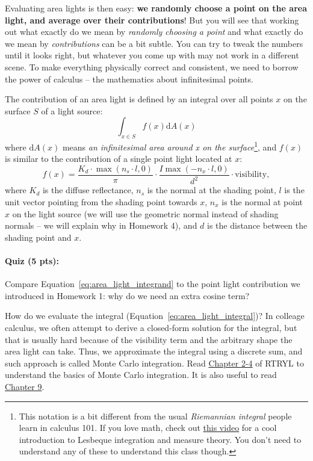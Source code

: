 Evaluating area lights is then easy: \textbf{we randomly choose a point on the area light, and average over their contributions}! But you will see that working out what exactly do we mean by \emph{randomly choosing a point} and what exactly do we mean by \emph{contributions} can be a bit subtle. You can try to tweak the numbers until it looks right, but whatever you come up with may not work in a different scene. To make everything physically correct and consistent, we need to borrow the power of calculus -- the mathematics about infinitesimal points.

The contribution of an area light is defined by an integral over all points $x$ on the surface $S$ of a light source:
\begin{equation}
    \int_{x \in S} f(x) \mathrm{d}A(x)
    \label{eq:area_light_integral}
\end{equation}
where $\mathrm{d}A(x)$ means \emph{an infinitesimal area around x on the surface}\footnote{This notation is a bit different from the usual \emph{Riemannian integral} people learn in calculus 101. If you love math, check out \href{https://www.youtube.com/watch?v=LDNDTOVnKJk}{this video} for a cool introduction to Lesbeque integration and measure theory. You don't need to understand any of these to understand this class though.}, and $f(x)$ is similar to the contribution of a single point light located at $x$:
\begin{equation}
    f(x) = \frac{K_d \cdot \max\left(n_s \cdot l, 0\right)}{\pi} \cdot \frac{I \max\left(-n_x \cdot l, 0\right)}{d^2} \cdot \text{visibility},
    \label{eq:area_light_integrand}
\end{equation}
where $K_d$ is the diffuse reflectance, $n_s$ is the normal at the shading point, $l$ is the unit vector pointing from the shading point towards $x$, $n_x$ is the normal at point $x$ on the light source (we will use the geometric normal instead of shading normals -- we will explain why in Homework 4), and $d$ is the distance between the shading point and $x$.

\paragraph{Quiz (5 pts):} Compare Equation~\eqref{eq:area_light_integrand} to the point light contribution we introduced in Homework 1: why do we need an extra cosine term?

How do we evaluate the integral (Equation~\eqref{eq:area_light_integral})? In colleage calculus, we often attempt to derive a closed-form solution for the integral, but that is usually hard because of the visibility term and the arbitrary shape the area light can take. Thus, we approximate the integral using a discrete sum, and such approach is called Monte Carlo integration. Read \href{https://raytracing.github.io/books/RayTracingTheRestOfYourLife.html#asimplemontecarloprogram}{Chapter 2-4} of RTRYL to understand the basics of Monte Carlo integration. It is also useful to read \href{https://raytracing.github.io/books/RayTracingTheRestOfYourLife.html#samplinglightsdirectly}{Chapter 9}.

